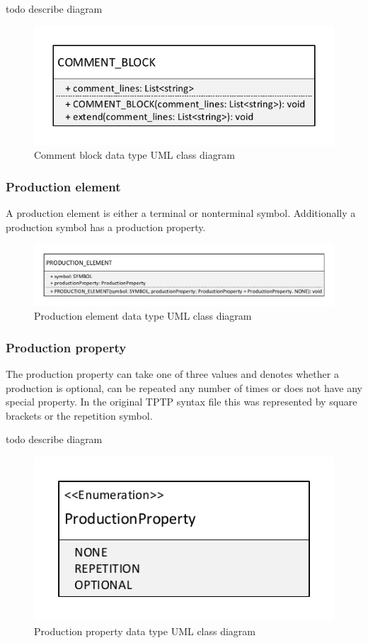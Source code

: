 todo describe diagram
\begin{figure}[H]
\centering
\includegraphics[width=.5\textwidth]{images/Concept_uml_data_types_comment_block.pdf}
\caption{Comment block data type UML class diagram}
\label{fig:ConceptCommentBlockClassDiagram}
\end{figure}

\subsubsection{Production element}
A production element is either a terminal or nonterminal symbol. Additionally a production symbol has a production property.
\begin{figure}[H]
\centering
\includegraphics[width=.8\textwidth]{images/Concept_uml_data_types_production_element.pdf}
\caption{Production element data type UML class diagram}
\label{fig:ConceptProductionElementClassDiagram}
\end{figure}

\subsubsection{Production property}
The production property can take one of three values and denotes whether a production is optional, can be repeated any number of times or does not have any special property.
In the original \ac{TPTP} syntax file this was represented by square brackets or the repetition symbol.

todo describe diagram
\begin{figure}[H]
\centering
\includegraphics[width=.4\textwidth]{images/Concept_uml_data_types_production_property.pdf}
\caption{Production property data type UML class diagram}
\label{fig:ConceptProductionPropertyClassDiagram}
\end{figure}

